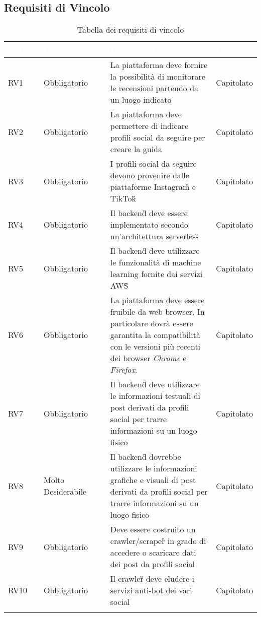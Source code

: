 \subsection{Requisiti di Vincolo}
{
      \setlength{\freewidth}{\dimexpr\textwidth-10\tabcolsep}
      \renewcommand{\arraystretch}{1.5}
      \centering
      \setlength{\aboverulesep}{0pt}
      \setlength{\belowrulesep}{0pt}
      \begin{longtable}{C{.15\freewidth} C{.2\freewidth} C{.528\freewidth} C{.15\freewidth}}
         \toprule
      \textcolor{white}{\textbf{Codice}}&
      \textcolor{white}{\textbf{Classificazione}}&
      \textcolor{white}{\textbf{Descrizione}}&
      \textcolor{white}{\textbf{Fonti}}\\	
      \toprule
      \endhead
      
      RV1 & Obbligatorio & La piattaforma deve fornire la possibilità di monitorare le recensioni partendo da un luogo indicato & Capitolato \\
      RV2 & Obbligatorio & La piattaforma deve permettere di indicare profili social da seguire per creare la guida & Capitolato \\
      RV3 & Obbligatorio & I profili social da seguire devono provenire dalle piattaforme Instagram\G{} e TikTok\G{} & Capitolato \\
      RV4 & Obbligatorio & Il backend\G{} deve essere implementato secondo un'architettura serverless\G{} & Capitolato \\
      RV5 & Obbligatorio & Il backend\G{} deve utilizzare le funzionalità di machine learning fornite dai servizi AWS\G{} & Capitolato \\
      RV6 & Obbligatorio & La piattaforma deve essere fruibile da web browser. In particolare dovrà essere garantita la compatibilità con le versioni più recenti dei browser \textit{Chrome} e \textit{Firefox}. & Capitolato \\
      RV7 & Obbligatorio & Il backend\G{} deve utilizzare le informazioni testuali di post derivati da profili social per trarre informazioni su un luogo fisico & Capitolato \\
      RV8 & Molto Desiderabile & Il backend\G{} dovrebbe utilizzare le informazioni grafiche e visuali di post derivati da profili social per trarre informazioni su un luogo fisico & Capitolato \\
      RV9 & Obbligatorio & Deve essere costruito un crawler/scraper\G{} in grado di accedere o scaricare dati dei post da profili social & Capitolato \\
      RV10 & Obbligatorio & Il crawler\G{} deve eludere i servizi anti-bot dei vari social & Capitolato \\
      \bottomrule
      \caption{Tabella dei requisiti di vincolo}
      \end{longtable}
}
